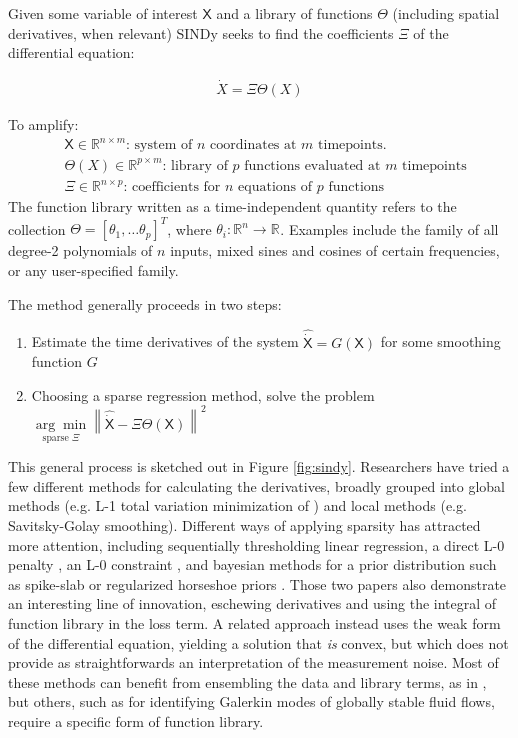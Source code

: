 \documentclass{article}
\newcommand{\mat}[1]{\boldsymbol{\mathsf{#1}}}
\newcommand{\R}[1]{\mathbb{R}^{#1}}
\begin{document}
Given some variable of interest $\mat X$ and a library of functions $\mat \Theta$ (including spatial derivatives, when relevant) SINDy seeks to find the coefficients $\mat \Xi$ of the differential equation:

\begin{align}
    \label{eqn:sindy_ode}
    \dot X = \Xi\Theta(X)
\end{align}

To amplify:
\begin{align*}
    &\mat X \in \R{n \times m}\text{: system of $n$ coordinates at $m$ timepoints.}\\
    &\mat \Theta(X) \in \R{p \times m}\text{: library of $p$ functions evaluated at $m$ timepoints}\\
    &\mat \Xi \in \R{n \times p}\text{: coefficients for $n$ equations of $p$ functions}
\end{align*}
The function library written as a time-independent quantity refers to the collection $\mat \Theta = [\theta_1, \dots \theta_p]^T$, where $\theta_i: \R{n}\rightarrow\R{}$. Examples include the family of all degree-2 polynomials of $n$ inputs, mixed sines and cosines of certain frequencies, or any user-specified family.

The method generally proceeds in two steps:

\begin{enumerate}
    \item Estimate the time derivatives of the system ${\mat{\widehat{\dot X}}} = G(\mat X)$ for some smoothing function $G$
    \item Choosing a sparse regression method, solve the problem $\underset{\text{sparse } \mat \Xi}{\arg\min} \left\| \mat{\widehat{\dot{X}}} - \mat \Xi \mat \Theta(\mat X) \right\|^2$
\end{enumerate}
This general process is sketched out in Figure \ref{fig:sindy}.  Researchers have tried a few different methods for calculating the derivatives, broadly grouped into  global methods (e.g. L-1 total variation minimization of \cite{Chartrand2011}) and local methods (e.g. Savitsky-Golay smoothing).  Different ways of applying sparsity has attracted more attention, including sequentially thresholding linear regression, a direct L-0 penalty \cite{Champion2020}, an L-0 constraint \cite{Bertsimas2023}, and bayesian methods for a prior distribution such as spike-slab or regularized horseshoe priors \cite{Hirsh2022,gao2022bayesian}.  Those two papers also demonstrate an interesting line of innovation, eschewing derivatives and using the integral of function library in the loss term.  A related approach instead uses the weak form of the differential equation, yielding a solution that {\it is} convex, but which does not provide as straightforwards an interpretation of the measurement noise. Most of these methods can benefit from ensembling the data and library terms, as in \cite{Fasel2022}, but others, such as \cite{Kaptanoglu2021} for identifying Galerkin modes of globally stable fluid flows, require a specific form of function library.
\end{document}
